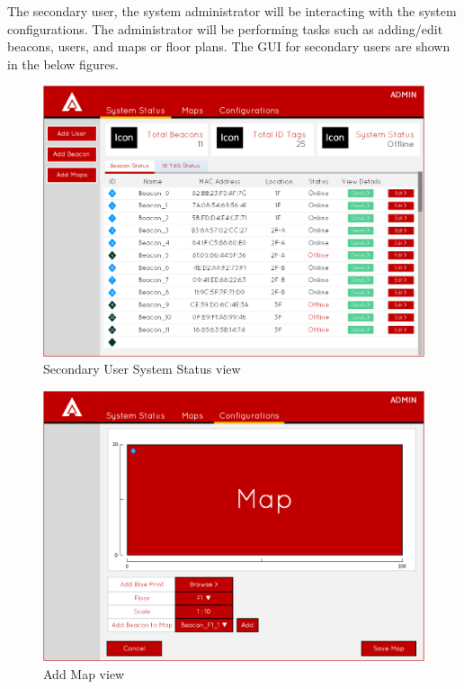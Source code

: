 \pagebreak
The secondary user, the system administrator will be interacting with the system configurations. The administrator will be performing tasks such as adding/edit beacons, users, and maps or floor plans. The GUI for secondary users are shown in the below figures.

\medskip
\begin{figure}[H]
\centering
    \includegraphics[scale=0.45]{./images/UIMU_status_IT.png}
    \caption{Secondary User System Status view}
    \label{ss_it}
\end{figure}

\medskip
\begin{figure}[H]
\centering
    \includegraphics[scale=0.45]{./images/UIMU_add_map.png}
    \caption{Add Map view}
    \label{add_map}
\end{figure}
\pagebreak


